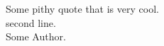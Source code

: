 \begin{raggedleft} %
	\null %
	\vfill
Some pithy quote that is very cool.\\
second line.\\
Some Author.
	\vfill %
	\null
\end{raggedleft}
